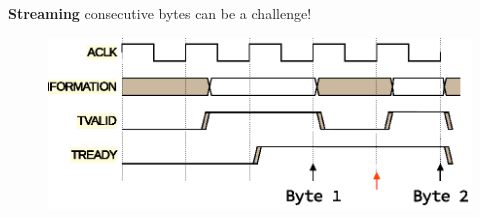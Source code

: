 \begin{frame}[fragile]
	\textbf{Streaming} consecutive bytes can be a challenge!
	\begin{figure}
                \includegraphics[scale=0.7]{implementation/axi4_handshake_extended.eps}

        \end{figure}
\end{frame}



